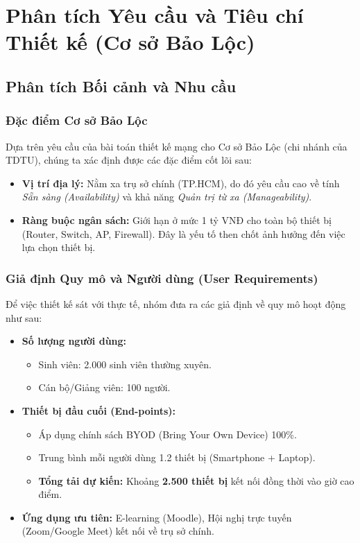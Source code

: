 \section{Phân tích Yêu cầu và Tiêu chí Thiết kế (Cơ sở Bảo Lộc)}

\subsection{Phân tích Bối cảnh và Nhu cầu}

\subsubsection{Đặc điểm Cơ sở Bảo Lộc}
Dựa trên yêu cầu của bài toán thiết kế mạng cho Cơ sở Bảo Lộc (chi nhánh của TDTU), chúng ta xác định được các đặc điểm cốt lõi sau:
\begin{itemize}
    \item \textbf{Vị trí địa lý:} Nằm xa trụ sở chính (TP.HCM), do đó yêu cầu cao về tính \textit{Sẵn sàng (Availability)} và khả năng \textit{Quản trị từ xa (Manageability)}.
    \item \textbf{Ràng buộc ngân sách:} Giới hạn ở mức 1 tỷ VNĐ cho toàn bộ thiết bị (Router, Switch, AP, Firewall). Đây là yếu tố then chốt ảnh hưởng đến việc lựa chọn thiết bị.
\end{itemize}

\subsubsection{Giả định Quy mô và Người dùng (User Requirements)}
Để việc thiết kế sát với thực tế, nhóm đưa ra các giả định về quy mô hoạt động như sau:
\begin{itemize}
    \item \textbf{Số lượng người dùng:}
    \begin{itemize}
        \item Sinh viên: 2.000 sinh viên thường xuyên.
        \item Cán bộ/Giảng viên: 100 người.
    \end{itemize}
    \item \textbf{Thiết bị đầu cuối (End-points):}
    \begin{itemize}
        \item Áp dụng chính sách BYOD (Bring Your Own Device) 100\%.
        \item Trung bình mỗi người dùng 1.2 thiết bị (Smartphone + Laptop).
        \item \textbf{Tổng tải dự kiến:} Khoảng \textbf{2.500 thiết bị} kết nối đồng thời vào giờ cao điểm.
    \end{itemize}
    \item \textbf{Ứng dụng ưu tiên:} E-learning (Moodle), Hội nghị trực tuyến (Zoom/Google Meet) kết nối về trụ sở chính.
\end{itemize}

